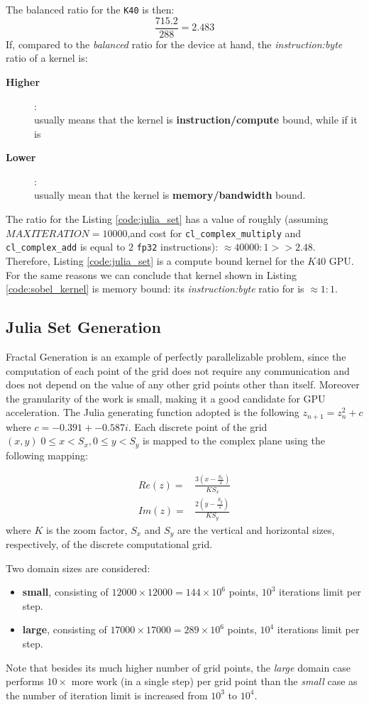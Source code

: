 The balanced ratio for the \texttt{K40} is then:\[\frac{715.2}{288} = 2.483\]
If, compared to the \textit{balanced} ratio for the device at hand, the \textit{instruction:byte} ratio of a kernel is: 
\begin{description}
	\item[\textbf{Higher}]:\\usually means that the kernel is \textbf{instruction/compute} bound, while if it is
	\item[\textbf{Lower}]:\\usually mean that the kernel is \textbf{memory/bandwidth} bound.
\end{description}

The ratio for the Listing \ref{code:julia_set} has a value of roughly (assuming $MAXITERATION=10000$,and cost for \texttt{cl\_complex\_multiply} and \texttt{cl\_complex\_add} is equal to $2$ \texttt{fp32} instructions): $\approx 40000:1 >> 2.48$. Therefore, Listing \ref{code:julia_set} is a compute bound kernel for the $K40$ GPU.
For the same reasons we can conclude that kernel shown in Listing  \ref{code:sobel_kernel} is memory bound: its \textit{instruction:byte} ratio for is $\approx 1:1$. 

\subsection{Julia Set Generation}
\label{sec:julia_performance}
Fractal Generation is an example of perfectly parallelizable problem, since the computation of each point of the grid does not require any communication and does not depend on the value of any other grid points other than itself. Moreover the granularity of the work is small, making it a good candidate for GPU acceleration.
The Julia generating function adopted is the following $z_{n+1} = z^2_n + c$ where $c=-0.391+-0.587i$. Each discrete point of the grid $(x,y)\; 0\leq x < S_x, 0\leq y < S_y$ is mapped to the complex plane using the following mapping:

\begin{align*}
	Re(z)=&\frac{3(x-\frac{S_x}{2})}{K S_x} \\
	Im(z)=&\frac{2(y-\frac{S_y}{2})}{K S_y}
\end{align*}
where $K$ is the zoom factor, $S_x$ and $S_y$ are the vertical and horizontal sizes, respectively, of the discrete computational grid.

Two domain sizes are considered:
	\begin{itemize}
		\item \textbf{small}, consisting of  $12000 \times 12000 = 144 \times 10^6$ points, $10^3$ iterations limit per step.
		\item \textbf{large}, consisting of $17000 \times 17000 = 289 \times 10^6$ points, $10^4$ iterations limit per step.
	\end{itemize}
Note that besides its much higher number of grid points, the \textit{large} domain case performs $10 \times$ more work (in a single step) per grid point than the \textit{small} case as the number of iteration limit is increased from $10^3$ to $10^4$.

